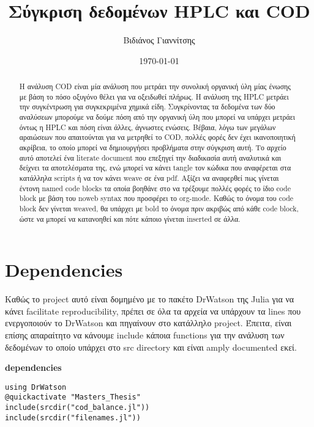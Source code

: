 \documentclass[11pt]{article}
\author{Βιδιάνος Γιαννίτσης}
\date{\today}
\title{Σύγκριση δεδομένων HPLC και COD}
\begin{document}
\maketitle
\tableofcontents

\begin{abstract}
Η ανάλυση COD είναι μία ανάλυση που μετράει την συνολική οργανική ύλη μίας ένωσης με βάση το πόσο οξυγόνο θέλει για να οξειδωθεί πλήρως. Η ανάλυση της HPLC μετράει την συγκέντρωση για συγκεκριμένα χημικά είδη. Συγκρίνοντας τα δεδομένα των δύο αναλύσεων μπορούμε να δούμε πόση από την οργανική ύλη που μπορεί να υπάρχει μετράει όντως η HPLC και πόση είναι άλλες, άγνωστες ενώσεις. Βέβαια, λόγω των μεγάλων αραιώσεων που απαιτούνται για να μετρηθεί το COD, πολλές φορές δεν έχει ικανοποιητική ακρίβεια, το οποίο μπορεί να δημιουργήσει προβλήματα στην σύγκριση αυτή. Το αρχείο αυτό αποτελεί ένα literate document που επεξηγεί την διαδικασία αυτή αναλυτικά και δείχνει τα αποτελέσματα της, ενώ μπορεί να κάνει tangle τον κώδικα που αναφέρεται στα κατάλληλα scripts ή να τον κάνει weave σε ένα pdf. Αξίζει να αναφερθεί πως γίνεται έντονη named code blocks τα οποία βοηθάνε στο να τρέξουμε πολλές φορές το ίδιο code block με βάση του noweb syntax που προσφέρει το org-mode. Καθώς το όνομα του code block δεν γίνεται weaved, θα υπάρχει με bold το όνομα πριν ακριβώς από κάθε code block, ώστε να μπορεί να κατανοηθεί και πότε κάποιο γίνεται inserted σε άλλα.
\end{abstract}

\section{Dependencies}
\label{sec:orgbc5cbdc}
Καθώς το project αυτό είναι δομημένο με το πακέτο DrWatson της Julia για να κάνει facilitate reproducibility, πρέπει σε όλα τα αρχεία να υπάρχουν τα lines που ενεργοποιούν το DrWatson και πηγαίνουν στο κατάλληλο project. Έπειτα, είναι επίσης απαραίτητο να κάνουμε include κάποια functions για την ανάλυση των δεδομένων το οποίο υπάρχει στο src directory και είναι amply documented εκεί.

\textbf{dependencies}
\begin{verbatim}
using DrWatson
@quickactivate "Masters_Thesis"
include(srcdir("cod_balance.jl"))
include(srcdir("filenames.jl"))
\end{verbatim}
\end{document}
